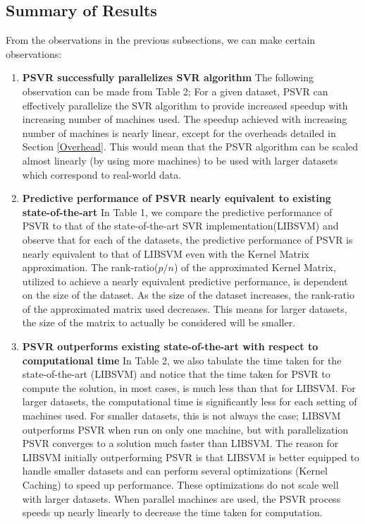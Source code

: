 \documentclass[12pt]{article}
\begin{document}
\subsection{Summary of Results}
\label{Summary of Results}
From the observations in the previous subsections, we can make certain observations:
\begin{enumerate}[label=(\alph*)]
\item {\bf PSVR successfully parallelizes SVR algorithm}
\newline
The following observation can be made from Table 2; For a given dataset, PSVR can effectively parallelize the SVR algorithm to provide increased speedup with increasing number of machines used. The speedup achieved with increasing number of machines is nearly linear, except for the overheads detailed in Section \ref{Overhead}. This would  mean that the PSVR algorithm can be scaled almost linearly (by using more machines) to be used with larger datasets which correspond to real-world data.

\item {\bf Predictive performance of PSVR nearly equivalent to existing state-of-the-art}
\newline
In Table 1, we compare the predictive performance of PSVR to that of the state-of-the-art SVR implementation(LIBSVM) and observe that for each of the datasets, the predictive performance of PSVR is nearly equivalent to that of LIBSVM even with the Kernel Matrix approximation.
\newline
The rank-ratio($p/n$) of the approximated Kernel Matrix, utilized to achieve a nearly equivalent predictive performance, is dependent on the size of the dataset. As the size of the dataset increases, the rank-ratio of the approximated matrix used decreases. This means for larger datasets, the size of the matrix to actually be considered will be smaller.

\item {\bf PSVR outperforms existing state-of-the-art with respect to computational time}
\newline
In Table 2, we also tabulate the time taken for the state-of-the-art (LIBSVM) and notice that the time taken for PSVR to compute the solution, in most cases, is much less than that for LIBSVM. For larger datasets, the computational time is significantly less for each setting of machines used. 
\newline
For smaller datasets, this is not always the case; LIBSVM outperforms PSVR when run on only one machine, but with parallelization PSVR converges to a solution much faster than LIBSVM. The reason for LIBSVM initially outperforming PSVR is that LIBSVM is better equipped to handle smaller datasets and can perform several optimizations (Kernel Caching) to speed up performance. These optimizations do not scale well with larger datasets. When parallel machines are used, the PSVR process speeds up nearly linearly to decrease the time taken for computation.
\end{enumerate}
\cleardoublepage
\end{document}

